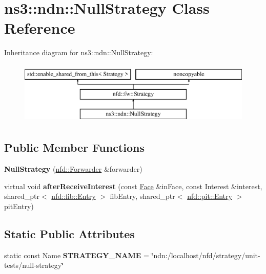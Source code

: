 \hypertarget{classns3_1_1ndn_1_1NullStrategy}{}\section{ns3\+:\+:ndn\+:\+:Null\+Strategy Class Reference}
\label{classns3_1_1ndn_1_1NullStrategy}
Inheritance diagram for ns3\+:\+:ndn\+:\+:Null\+Strategy\+:\begin{figure}[H]
\begin{center}
\leavevmode
\includegraphics[height=3.000000cm]{classns3_1_1ndn_1_1NullStrategy}
\end{center}
\end{figure}
\subsection*{Public Member Functions}
\begin{DoxyCompactItemize}
\item 
{\bfseries Null\+Strategy} (\hyperlink{classnfd_1_1Forwarder}{nfd\+::\+Forwarder} \&forwarder)\hypertarget{classns3_1_1ndn_1_1NullStrategy_a8912f4e075db95d2872c9d410198f28c}{}\label{classns3_1_1ndn_1_1NullStrategy_a8912f4e075db95d2872c9d410198f28c}

\item 
virtual void {\bfseries after\+Receive\+Interest} (const \hyperlink{classnfd_1_1Face}{Face} \&in\+Face, const Interest \&interest, shared\+\_\+ptr$<$ \hyperlink{classnfd_1_1fib_1_1Entry}{nfd\+::fib\+::\+Entry} $>$ fib\+Entry, shared\+\_\+ptr$<$ \hyperlink{classnfd_1_1pit_1_1Entry}{nfd\+::pit\+::\+Entry} $>$ pit\+Entry)\hypertarget{classns3_1_1ndn_1_1NullStrategy_a55db716a37ca424d6dd0d2cb93194a82}{}\label{classns3_1_1ndn_1_1NullStrategy_a55db716a37ca424d6dd0d2cb93194a82}

\end{DoxyCompactItemize}
\subsection*{Static Public Attributes}
\begin{DoxyCompactItemize}
\item 
static const Name {\bfseries S\+T\+R\+A\+T\+E\+G\+Y\+\_\+\+N\+A\+ME} = \char`\"{}ndn\+:/localhost/nfd/strategy/unit-\/tests/null-\/strategy\char`\"{}\hypertarget{classns3_1_1ndn_1_1NullStrategy_a407d85d109f11d57903ac8175d6774a0}{}\label{classns3_1_1ndn_1_1NullStrategy_a407d85d109f11d57903ac8175d6774a0}

\end{DoxyCompactItemize}
